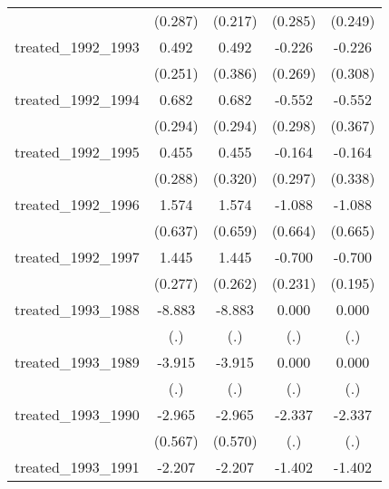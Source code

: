 {\begin{tabular}{l*{4}{c}}
            &     (0.287)         &     (0.217)         &     (0.285)         &     (0.249)         \\
[1em]
treated\_1992\_1993&       0.492\sym{*}  &       0.492         &      -0.226         &      -0.226         \\
            &     (0.251)         &     (0.386)         &     (0.269)         &     (0.308)         \\
[1em]
treated\_1992\_1994&       0.682\sym{*}  &       0.682\sym{*}  &      -0.552         &      -0.552         \\
            &     (0.294)         &     (0.294)         &     (0.298)         &     (0.367)         \\
[1em]
treated\_1992\_1995&       0.455         &       0.455         &      -0.164         &      -0.164         \\
            &     (0.288)         &     (0.320)         &     (0.297)         &     (0.338)         \\
[1em]
treated\_1992\_1996&       1.574\sym{*}  &       1.574\sym{*}  &      -1.088         &      -1.088         \\
            &     (0.637)         &     (0.659)         &     (0.664)         &     (0.665)         \\
[1em]
treated\_1992\_1997&       1.445\sym{***}&       1.445\sym{***}&      -0.700\sym{**} &      -0.700\sym{***}\\
            &     (0.277)         &     (0.262)         &     (0.231)         &     (0.195)         \\
[1em]
treated\_1993\_1988&      -8.883         &      -8.883         &       0.000         &       0.000         \\
            &         (.)         &         (.)         &         (.)         &         (.)         \\
[1em]
treated\_1993\_1989&      -3.915         &      -3.915         &       0.000         &       0.000         \\
            &         (.)         &         (.)         &         (.)         &         (.)         \\
[1em]
treated\_1993\_1990&      -2.965\sym{***}&      -2.965\sym{***}&      -2.337         &      -2.337         \\
            &     (0.567)         &     (0.570)         &         (.)         &         (.)         \\
[1em]
treated\_1993\_1991&      -2.207\sym{***}&      -2.207\sym{***}&      -1.402\sym{**} &      -1.402\sym{*}  \\

\end{tabular}}
